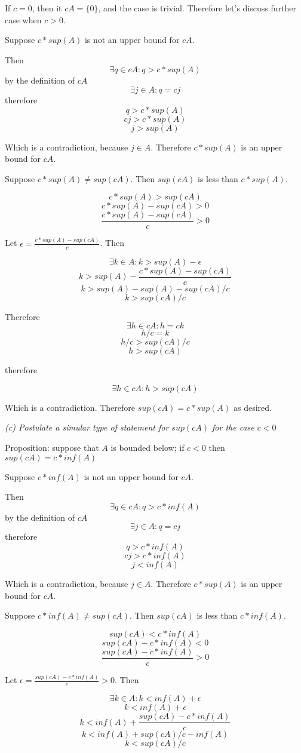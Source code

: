 \documentclass[11pt,oneside,titlepage]{book}
\begin{document}
If $c = 0$, then it $cA = \{0\}$, and the case is trivial. Therefore let's
discuss further case when $c > 0$.

Suppose $c * sup(A)$ is not an upper bound for $cA$.

Then
$$\exists q \in cA: q > c * sup(A)$$
by the definition of $cA$
$$\exists j \in A: q = cj$$
therefore
$$q > c * sup(A)$$
$$cj > c * sup(A)$$
$$j > sup(A)$$

Which is a contradiction, because $j \in A$. Therefore $c * sup(A)$ is an
upper bound for $cA$.

Suppose $c *sup(A) \neq sup(cA)$. Then $sup(c A)$ is less
than $c * sup(A)$.

$$c * sup(A) > sup(cA)$$
$$c * sup(A) - sup(cA) > 0$$
$$\frac{c * sup(A) - sup(cA)}{c} > 0$$

Let $\epsilon = \frac{c * sup(A) - sup(cA)}{c}$. Then


$$\exists k \in A: k > sup(A) - \epsilon$$
$$k > sup(A) - \frac{c * sup(A) - sup(cA)}{c}$$
$$k > sup(A) - sup(A) - sup(cA)/c$$
$$k > sup(cA)/c$$

Therefore
$$\exists h \in cA: h = ck$$
$$h/c = k$$
$$h/c>  sup(cA)/c$$
$$h > sup(cA)$$

therefore

$$\exists h \in cA: h > sup(cA)$$

Which is a contradiction. Therefore $sup(cA) = c * sup(A)$ as desired.

\textit{(c) Postulate a simular type of statement for $sup(cA)$ for the case
  $c < 0$}

Proposition: suppose that $A$ is bounded below;  if $c < 0$ then $sup(cA) = c
* inf(A)$

Suppose $c * inf(A)$ is not an upper bound for $cA$.

Then
$$\exists q \in cA: q > c * inf(A)$$
by the definition of $cA$
$$\exists j \in A: q = cj$$
therefore
$$q > c * inf(A)$$
$$cj > c * inf(A)$$
$$j < inf(A)$$

Which is a contradiction, because $j \in A$. Therefore $c * sup(A)$ is an
upper bound for $cA$.

Suppose $c * inf(A) \neq sup(cA)$. Then $sup(c A)$ is less
than $c * inf(A)$.

$$sup(cA) < c * inf(A)$$
$$sup(cA) - c * inf(A) < 0$$
$$\frac{sup(cA) - c * inf(A)}{c} > 0$$

Let $\epsilon = \frac{sup(cA) - c * inf(A)}{c} > 0$. Then

$$\exists k \in A: k < inf(A) + \epsilon$$
$$ k < inf(A) + \epsilon$$
$$ k < inf(A) + \frac{sup(cA) - c * inf(A)}{c}$$
$$ k < inf(A) + sup(cA)/c - inf(A)$$
$$ k < sup(cA)/c$$
\end{document}
